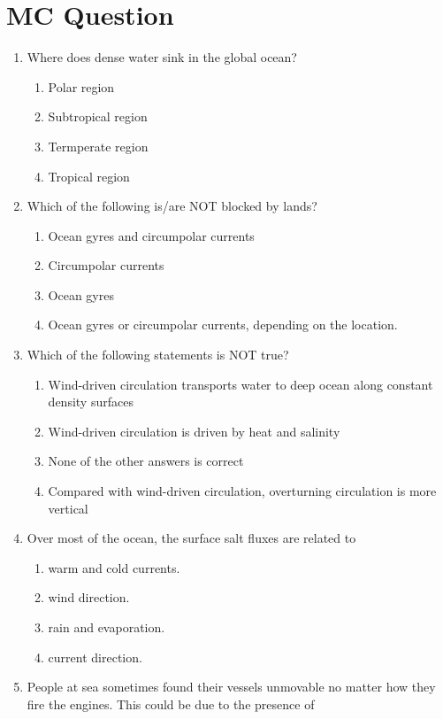 \documentclass{report}
\begin{document}
\section{MC Question}
\begin{enumerate}
    \item Where does dense water sink in the global ocean?
    \begin{enumerate}
        \item Polar region
        \item Subtropical region 
        \item Termperate region 
        \item Tropical region
    \end{enumerate}
    \item Which of the following is/are NOT blocked by lands?
    \begin{enumerate}
        \item Ocean gyres and circumpolar currents
        \item Circumpolar currents 
        \item Ocean gyres 
        \item Ocean gyres or circumpolar currents, depending on the location. 
    \end{enumerate}
    \item Which of the following statements is NOT true?
    \begin{enumerate}
        \item Wind-driven circulation transports water to deep ocean along constant density surfaces
        \item Wind-driven circulation is driven by heat and salinity
        \item None of the other answers is correct
        \item Compared with wind-driven circulation, overturning circulation is more vertical
    \end{enumerate}
    \item Over most of the ocean, the surface salt fluxes are related to
    \begin{enumerate}
        \item   warm and cold currents.
        \item   wind direction. 
        \item   rain and evaporation. 
        \item   current direction. 
    \end{enumerate}
    \item People at sea sometimes found their vessels unmovable no matter how they fire the engines. This could be due to the presence of

\end{enumerate}
\end{document}
